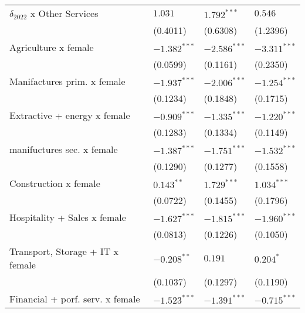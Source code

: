 \begin{tabular}{llll}
$\delta_{2022}$ x Other Services                   &            $1.031$ &      $1.792^{***}$ &            $0.546$ \\
                                                   &           (0.4011) &           (0.6308) &           (1.2396) \\
Agriculture x female                               &     $-1.382^{***}$ &     $-2.586^{***}$ &     $-3.311^{***}$ \\
                                                   &           (0.0599) &           (0.1161) &           (0.2350) \\
Manifactures prim. x female                        &     $-1.937^{***}$ &     $-2.006^{***}$ &     $-1.254^{***}$ \\
                                                   &           (0.1234) &           (0.1848) &           (0.1715) \\
Extractive + energy x female                       &     $-0.909^{***}$ &     $-1.335^{***}$ &     $-1.220^{***}$ \\
                                                   &           (0.1283) &           (0.1334) &           (0.1149) \\
manifuctures sec. x female                         &     $-1.387^{***}$ &     $-1.751^{***}$ &     $-1.532^{***}$ \\
                                                   &           (0.1290) &           (0.1277) &           (0.1558) \\
Construction x female                              &       $0.143^{**}$ &      $1.729^{***}$ &      $1.034^{***}$ \\
                                                   &           (0.0722) &           (0.1455) &           (0.1796) \\
Hospitality + Sales x female                       &     $-1.627^{***}$ &     $-1.815^{***}$ &     $-1.960^{***}$ \\
                                                   &           (0.0813) &           (0.1226) &           (0.1050) \\
Transport, Storage + IT x female                   &      $-0.208^{**}$ &            $0.191$ &          $0.204^*$ \\
                                                   &           (0.1037) &           (0.1297) &           (0.1190) \\
Financial + porf. serv. x female                   &     $-1.523^{***}$ &     $-1.391^{***}$ &     $-0.715^{***}$ \\

\end{tabular}

